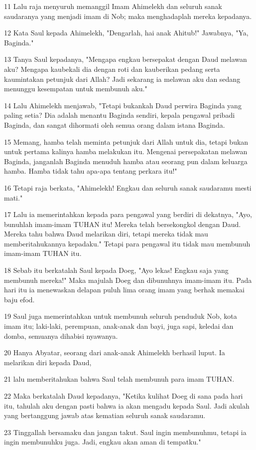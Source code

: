 \par 11 Lalu raja menyuruh memanggil Imam Ahimelekh dan seluruh sanak saudaranya yang menjadi imam di Nob; maka menghadaplah mereka kepadanya.
\par 12 Kata Saul kepada Ahimelekh, "Dengarlah, hai anak Ahitub!" Jawabnya, "Ya, Baginda."
\par 13 Tanya Saul kepadanya, "Mengapa engkau bersepakat dengan Daud melawan aku? Mengapa kaubekali dia dengan roti dan kauberikan pedang serta kaumintakan petunjuk dari Allah? Jadi sekarang ia melawan aku dan sedang menunggu kesempatan untuk membunuh aku."
\par 14 Lalu Ahimelekh menjawab, "Tetapi bukankah Daud perwira Baginda yang paling setia? Dia adalah menantu Baginda sendiri, kepala pengawal pribadi Baginda, dan sangat dihormati oleh semua orang dalam istana Baginda.
\par 15 Memang, hamba telah meminta petunjuk dari Allah untuk dia, tetapi bukan untuk pertama kalinya hamba melakukan itu. Mengenai persepakatan melawan Baginda, janganlah Baginda menuduh hamba atau seorang pun dalam keluarga hamba. Hamba tidak tahu apa-apa tentang perkara itu!"
\par 16 Tetapi raja berkata, "Ahimelekh! Engkau dan seluruh sanak saudaramu mesti mati."
\par 17 Lalu ia memerintahkan kepada para pengawal yang berdiri di dekatnya, "Ayo, bunuhlah imam-imam TUHAN itu! Mereka telah bersekongkol dengan Daud. Mereka tahu bahwa Daud melarikan diri, tetapi mereka tidak mau memberitahukannya kepadaku." Tetapi para pengawal itu tidak mau membunuh imam-imam TUHAN itu.
\par 18 Sebab itu berkatalah Saul kepada Doeg, "Ayo lekas! Engkau saja yang membunuh mereka!" Maka majulah Doeg dan dibunuhnya imam-imam itu. Pada hari itu ia menewaskan delapan puluh lima orang imam yang berhak memakai baju efod.
\par 19 Saul juga memerintahkan untuk membunuh seluruh penduduk Nob, kota imam itu; laki-laki, perempuan, anak-anak dan bayi, juga sapi, keledai dan domba, semuanya dihabisi nyawanya.
\par 20 Hanya Abyatar, seorang dari anak-anak Ahimelekh berhasil luput. Ia melarikan diri kepada Daud,
\par 21 lalu memberitahukan bahwa Saul telah membunuh para imam TUHAN.
\par 22 Maka berkatalah Daud kepadanya, "Ketika kulihat Doeg di sana pada hari itu, tahulah aku dengan pasti bahwa ia akan mengadu kepada Saul. Jadi akulah yang bertanggung jawab atas kematian seluruh sanak saudaramu.
\par 23 Tinggallah bersamaku dan jangan takut. Saul ingin membunuhmu, tetapi ia ingin membunuhku juga. Jadi, engkau akan aman di tempatku."

